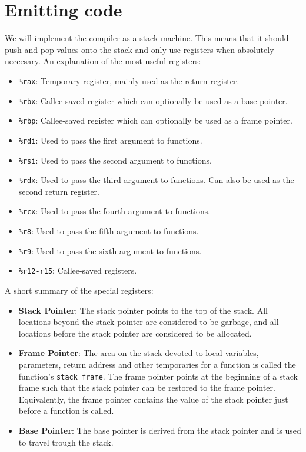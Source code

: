 \documentclass{report}
\begin{document}
	\section{Emitting code}
	We will implement the compiler as a stack machine. This means that it should push and pop values onto the stack and only use registers when absolutely neccesary. An explanation of the most useful registers:
	\begin{itemize}
		\item \texttt{\%rax}: Temporary register, mainly used as the return register.
		\item \texttt{\%rbx}: Callee-saved register which can optionally be used as a base pointer.
		\item \texttt{\%rbp}: Callee-saved register which can optionally be used as a frame pointer.
		\item \texttt{\%rdi}: Used to pass the first argument to functions.
		\item \texttt{\%rsi}: Used to pass the second argument to functions.
		\item \texttt{\%rdx}: Used to pass the third argument to functions. Can also be used as the second return register.
		\item \texttt{\%rcx}: Used to pass the fourth argument to functions.
		\item \texttt{\%r8}: Used to pass the fifth argument to functions.
		\item \texttt{\%r9}: Used to pass the sixth argument to functions.
		\item \texttt{\%r12-r15}: Callee-saved registers.
	\end{itemize}
	A short summary of the special registers:
	\begin{itemize}
		\item \textbf{Stack Pointer}: The stack pointer points to the top of the stack. All locations beyond the stack pointer are considered to be garbage, and all locations before the stack pointer are considered to be allocated.
		\item \textbf{Frame Pointer}: The area on the stack devoted to local variables, parameters, return address and other temporaries for a function is called the function's \texttt{stack frame}. The frame pointer points at the beginning of a stack frame such that the stack pointer can be restored to the frame pointer. Equivalently, the frame pointer contains the value of the stack pointer just before a function is called.
		\item \textbf{Base Pointer}: The base pointer is derived from the stack pointer and is used to travel trough the stack.
	\end{itemize}
	
\end{document}
